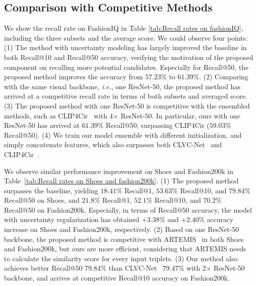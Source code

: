 \documentclass[10pt,twocolumn,letterpaper]{article}
\def\ie{\emph{i.e.}}
\begin{document}
\subsection{Comparison with Competitive Methods}
We show the recall rate on FashionIQ in Table \ref{tab:Recall rates on fashionIQ}, including the three subsets and the average score. 
We could observe four points: (1) The method with uncertainty modeling has largely improved the baseline in both Recall@10 and Recall@50 accuracy, verifying the motivation of the proposed component on recalling more potential candidates. 
Especially for Recall@50, the proposed method improves the accuracy from $57.23\%$ to $61.39\%$.
(2) Comparing with the same visual backbone, \ie, one ResNet-50, the proposed method has arrived at a competitive recall rate in terms of both subsets and averaged score. (3) The proposed method with one ResNet-50 is competitive with the ensembled methods, such as CLIP4Cir~\cite{CLIP4Cir} with 4$\times$ ResNet-50. 
In particular, ours with one ResNet-50 has arrived at $61.39\%$ Recall@50, surpassing CLIP4Cir ($59.03\%$ Recall@50). 
(4) We train our model ensemble with different initialization, and simply concatenate features, which also surpasses both CLVC-Net~\cite{CLVC-Net} and CLIP4Cir~\cite{CLIP4Cir}. 





We observe similar performance improvement on Shoes and Fashion200k in Table~\ref{tab:Recall rates on Shoes and fashion200k}. (1) The proposed method surpasses the baseline, yielding $18.41\%$ Recall@1, $53.63\%$ Recall@10, and $79.84\%$ Recall@50 on Shoes, and $21.8\%$ Recall@1, $52.1\%$ Recall@10, and $70.2\%$ Recall@50 on Fashion200k. Especially, in terms of Recall@50 accuracy, the model with uncertainty regularization has obtained $+3.38\%$ and $+2.40\%$ accuracy increase on Shoes and Fashion200k, respectively. 
(2) Based on one ResNet-50 backbone, the proposed method is competitive with ARTEMIS~\cite{delmas2022artemis} in both Shoes and Fashion200k, but ours are more efficient, considering that ARTEMIS needs to calculate the similarity score for every input triplets. 
(3) Our method also achieves better Recall@50 $79.84\%$ than CLVC-Net~\cite{CLVC-Net} $79.47\%$ with 2$\times$ ResNet-50 backbone, and arrives at competitive Recall@10 accuracy on Fashion200k.  
\end{document}
